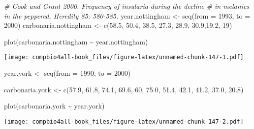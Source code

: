 \documentclass[
]{book}
\newenvironment{Shaded}{\begin{snugshade}}{\end{snugshade}}
\newcommand{\AttributeTok}[1]{\textcolor[rgb]{0.77,0.63,0.00}{#1}}
\newcommand{\CommentTok}[1]{\textcolor[rgb]{0.56,0.35,0.01}{\textit{#1}}}
\newcommand{\DecValTok}[1]{\textcolor[rgb]{0.00,0.00,0.81}{#1}}
\newcommand{\FloatTok}[1]{\textcolor[rgb]{0.00,0.00,0.81}{#1}}
\newcommand{\FunctionTok}[1]{\textcolor[rgb]{0.00,0.00,0.00}{#1}}
\newcommand{\NormalTok}[1]{#1}
\newcommand{\OtherTok}[1]{\textcolor[rgb]{0.56,0.35,0.01}{#1}}
\newcommand{\SpecialCharTok}[1]{\textcolor[rgb]{0.00,0.00,0.00}{#1}}
\begin{document}
\begin{Shaded}
\begin{Highlighting}[]
\CommentTok{\# Cook and Grant 2000.  Frequency of insularia during the decline}
\CommentTok{\# in melanics in the peppered.  Heredity 85: 580{-}585.}
\NormalTok{year.nottingham }\OtherTok{\textless{}{-}} \FunctionTok{seq}\NormalTok{(}\AttributeTok{from =} \DecValTok{1993}\NormalTok{,}
                       \AttributeTok{to =} \DecValTok{2000}\NormalTok{)}
\NormalTok{carbonaria.nottingham }\OtherTok{\textless{}{-}} \FunctionTok{c}\NormalTok{(}\FloatTok{58.5}\NormalTok{, }\FloatTok{50.4}\NormalTok{, }\FloatTok{38.5}\NormalTok{, }\FloatTok{27.3}\NormalTok{, }\FloatTok{28.9}\NormalTok{, }
                           \FloatTok{30.9}\NormalTok{,}\FloatTok{19.2}\NormalTok{, }\DecValTok{19}\NormalTok{)}

\FunctionTok{plot}\NormalTok{(carbonaria.nottingham }\SpecialCharTok{\textasciitilde{}}\NormalTok{ year.nottingham)}
\end{Highlighting}
\end{Shaded}

\texttt{[image: compbio4all-book\_files/figure-latex/unnamed-chunk-147-1.pdf]}

\begin{Shaded}
\begin{Highlighting}[]
\NormalTok{year.york }\OtherTok{\textless{}{-}} \FunctionTok{seq}\NormalTok{(}\AttributeTok{from =} \DecValTok{1990}\NormalTok{,}
                 \AttributeTok{to =} \DecValTok{2000}\NormalTok{)}

\NormalTok{carbonaria.york }\OtherTok{\textless{}{-}} \FunctionTok{c}\NormalTok{(}\FloatTok{57.9}\NormalTok{, }\FloatTok{61.8}\NormalTok{, }\FloatTok{74.1}\NormalTok{, }\FloatTok{69.6}\NormalTok{, }\DecValTok{60}\NormalTok{, }\FloatTok{75.0}\NormalTok{,}
                     \FloatTok{51.4}\NormalTok{, }\FloatTok{42.1}\NormalTok{, }\FloatTok{41.2}\NormalTok{, }\FloatTok{37.0}\NormalTok{, }\FloatTok{20.8}\NormalTok{)}

\FunctionTok{plot}\NormalTok{(carbonaria.york }\SpecialCharTok{\textasciitilde{}}\NormalTok{ year.york)}
\end{Highlighting}
\end{Shaded}

\texttt{[image: compbio4all-book\_files/figure-latex/unnamed-chunk-147-2.pdf]}
\end{document}
